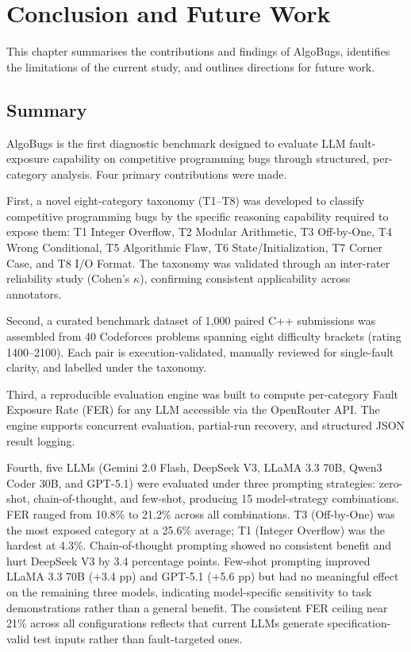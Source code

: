 \chapter{Conclusion and Future Work}

This chapter summarises the contributions and findings of AlgoBugs, identifies the limitations of the current study, and outlines directions for future work.

\section{Summary}

AlgoBugs is the first diagnostic benchmark designed to evaluate LLM fault-exposure capability on competitive programming bugs through structured, per-category analysis. Four primary contributions were made.

First, a novel eight-category taxonomy (T1--T8) was developed to classify competitive programming bugs by the specific reasoning capability required to expose them: T1 Integer Overflow, T2 Modular Arithmetic, T3 Off-by-One, T4 Wrong Conditional, T5 Algorithmic Flaw, T6 State/Initialization, T7 Corner Case, and T8 I/O Format. The taxonomy was validated through an inter-rater reliability study (Cohen's $\kappa$), confirming consistent applicability across annotators.

Second, a curated benchmark dataset of 1,000 paired C++ submissions was assembled from 40 Codeforces problems spanning eight difficulty brackets (rating 1400--2100). Each pair is execution-validated, manually reviewed for single-fault clarity, and labelled under the taxonomy.

Third, a reproducible evaluation engine was built to compute per-category Fault Exposure Rate (FER) for any LLM accessible via the OpenRouter API. The engine supports concurrent evaluation, partial-run recovery, and structured JSON result logging.

Fourth, five LLMs (Gemini 2.0 Flash, DeepSeek V3, LLaMA 3.3 70B, Qwen3 Coder 30B, and GPT-5.1) were evaluated under three prompting strategies: zero-shot, chain-of-thought, and few-shot, producing 15 model-strategy combinations. FER ranged from 10.8\% to 21.2\% across all combinations. T3 (Off-by-One) was the most exposed category at a 25.6\% average; T1 (Integer Overflow) was the hardest at 4.3\%. Chain-of-thought prompting showed no consistent benefit and hurt DeepSeek V3 by 3.4 percentage points. Few-shot prompting improved LLaMA 3.3 70B (+3.4 pp) and GPT-5.1 (+5.6 pp) but had no meaningful effect on the remaining three models, indicating model-specific sensitivity to task demonstrations rather than a general benefit. The consistent FER ceiling near 21\% across all configurations reflects that current LLMs generate specification-valid test inputs rather than fault-targeted ones.

